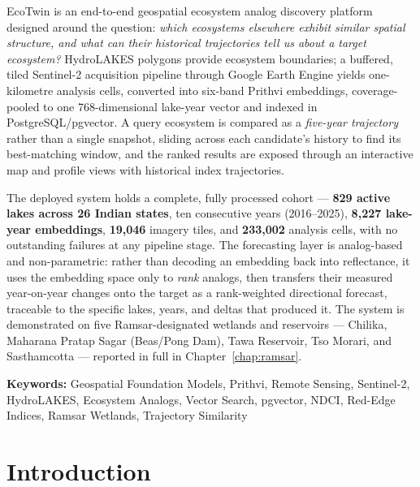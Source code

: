 \documentclass[12pt,a4paper,oneside]{report}
\begin{document}
EcoTwin is an end-to-end geospatial ecosystem analog discovery
platform designed around the question: \emph{which ecosystems
elsewhere exhibit similar spatial structure, and what can their
historical trajectories tell us about a target ecosystem?} HydroLAKES
polygons provide ecosystem boundaries; a buffered, tiled Sentinel-2
acquisition pipeline through Google Earth Engine yields
one-kilometre analysis cells, converted into six-band Prithvi
embeddings, coverage-pooled to one 768-dimensional lake-year vector
and indexed in PostgreSQL/pgvector. A query ecosystem is compared as
a \emph{five-year trajectory} rather than a single snapshot, sliding
across each candidate's history to find its best-matching window,
and the ranked results are exposed through an interactive map and
profile views with historical index trajectories.

The deployed system holds a complete, fully processed cohort ---
\textbf{829 active lakes across 26 Indian states}, ten consecutive
years (2016--2025), \textbf{8{,}227 lake-year embeddings},
\textbf{19{,}046} imagery tiles, and \textbf{233{,}002} analysis
cells, with no outstanding failures at any pipeline stage. The
forecasting layer is analog-based and non-parametric: rather than
decoding an embedding back into reflectance, it uses the embedding
space only to \emph{rank} analogs, then transfers their measured
year-on-year changes onto the target as a rank-weighted directional
forecast, traceable to the specific lakes, years, and deltas that
produced it. The system is demonstrated on five Ramsar-designated
wetlands and reservoirs --- Chilika, Maharana Pratap Sagar
(Beas/Pong Dam), Tawa Reservoir, Tso Morari, and Sasthamcotta ---
reported in full in Chapter~\ref{chap:ramsar}.

\textbf{Keywords:}
Geospatial Foundation Models, Prithvi, Remote Sensing, Sentinel-2,
HydroLAKES, Ecosystem Analogs, Vector Search, pgvector, NDCI,
Red-Edge Indices, Ramsar Wetlands, Trajectory Similarity

\clearpage


\tableofcontents
\clearpage


\chapter{Introduction}
\label{chap:introduction}
\end{document}
